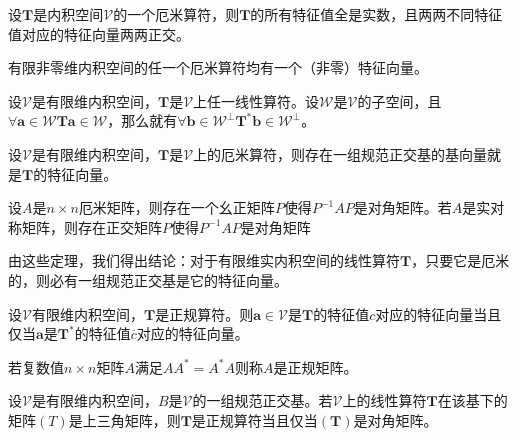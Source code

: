 \documentclass[main.tex]{subfiles}
\begin{document}
\begin{theorem}
设$\mathbf{T}$是内积空间$\mathcal{V}$的一个厄米算符，则$\mathbf{T}$的所有特征值全是实数，且两两不同特征值对应的特征向量两两正交。
\end{theorem}

\begin{theorem}
有限非零维内积空间的任一个厄米算符均有一个（非零）特征向量。
\end{theorem}

\begin{theorem}
设$\mathcal{V}$是有限维内积空间，$\mathbf{T}$是$\mathcal{V}$上任一线性算符。设$\mathcal{W}$是$\mathcal{V}$的子空间，且$\forall\mathbf{a}\in\mathcal{W}\mathbf{Ta}\in\mathcal{W}$，那么就有$\forall\mathbf{b}\in\mathcal{W}^\perp\mathbf{T}^*\mathbf{b}\in\mathcal{W}^\perp$。
\end{theorem}

\begin{theorem}
设$\mathcal{V}$是有限维内积空间，$\mathbf{T}$是$\mathcal{V}$上的厄米算符，则存在一组规范正交基的基向量就是$\mathbf{T}$的特征向量。
\end{theorem}

\begin{corollary}
设$A$是$n\times n$厄米矩阵，则存在一个幺正矩阵$P$使得$P^{-1}AP$是对角矩阵。若$A$是实对称矩阵，则存在正交矩阵$P$使得$P^{-1}AP$是对角矩阵
\end{corollary}

由这些定理，我们得出结论：对于有限维实内积空间的线性算符$\mathbf{T}$，只要它是厄米的，则必有一组规范正交基是它的特征向量。

\begin{theorem}
设$\mathcal{V}$有限维内积空间，$\mathbf{T}$是正规算符。则$\mathbf{a}\in\mathcal{V}$是$\mathbf{T}$的特征值$c$对应的特征向量当且仅当$\mathbf{a}$是$\mathbf{T}^*$的特征值$\overline{c}$对应的特征向量。
\end{theorem}

\begin{definition}[正规矩阵]
若复数值$n\times n$矩阵$A$满足$AA^*=A^*A$则称$A$是正规矩阵。
\end{definition}

\begin{theorem}
设$\mathcal{V}$是有限维内积空间，$B$是$\mathcal{V}$的一组规范正交基。若$\mathcal{V}$上的线性算符$\mathbf{T}$在该基下的矩阵$\left(T\right)$是上三角矩阵，则$\mathbf{T}$是正规算符当且仅当$\left(\mathbf{T}\right)$是对角矩阵。
\end{theorem}
\end{document}

